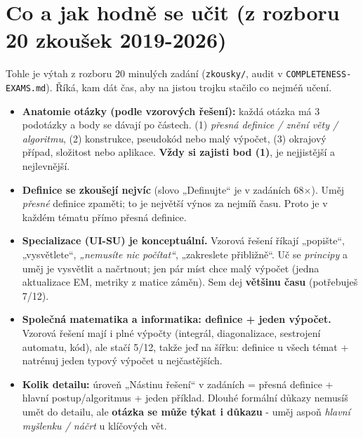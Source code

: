 \documentclass[11pt,a4paper]{article}
\begin{document}
\section{Co a jak hodně se učit (z rozboru 20 zkoušek 2019-2026)}

\begin{infobox}[title={Hlavní zjištění z reálných zadání}]
Tohle je výtah z rozboru 20 minulých zadání (\texttt{zkousky/}, audit v
\texttt{COMPLETENESS-EXAMS.md}). Říká, kam dát čas, aby na jistou trojku stačilo co nejméň učení.
\end{infobox}

\begin{itemize}[leftmargin=1.3em]
  \item \textbf{Anatomie otázky (podle vzorových řešení):} každá otázka má 3 podotázky a body
  se dávají po částech. (1) \emph{přesná definice / znění věty / algoritmu}, (2) konstrukce,
  pseudokód nebo malý výpočet, (3) okrajový případ, složitost nebo aplikace.
  \textbf{Vždy si zajisti bod (1)}, je nejjistější a nejlevnější.
  \item \textbf{Definice se zkoušejí nejvíc} (slovo „Definujte“ je v zadáních 68$\times$). Uměj
  \emph{přesné} definice zpaměti; to je největší výnos za nejmíň času. Proto je v každém tématu
   přímo přesná definice.
  \item \textbf{Specializace (UI-SU) je konceptuální.} Vzorová řešení říkají „popište“,
  „vysvětlete“, \emph{„nemusíte nic počítat“}, „zakreslete přibližně“. Uč se \emph{principy} a
  uměj je vysvětlit a načrtnout; jen pár míst chce malý výpočet (jedna aktualizace EM, metriky
  z matice záměn). Sem dej \textbf{většinu času} (potřebuješ 7/12).
  \item \textbf{Společná matematika a informatika: definice + jeden výpočet.} Vzorová řešení mají
  i plné výpočty (integrál, diagonalizace, sestrojení automatu, kód), ale stačí 5/12, takže jeď
  na šířku: definice u všech témat + natrénuj jeden typový výpočet u nejčastějších.
  \item \textbf{Kolik detailu:} úroveň „Nástinu řešení“ v zadáních = přesná definice + hlavní
  postup/algoritmus + jeden příklad. Dlouhé formální důkazy nemusíš umět do detailu, ale
  \textbf{otázka se může týkat i důkazu} - uměj aspoň \emph{hlavní myšlenku / náčrt} u klíčových vět.
\end{itemize}
\end{document}
